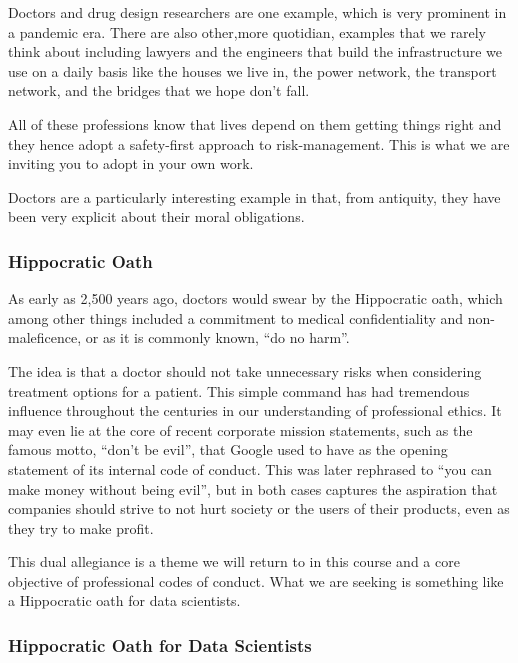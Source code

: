 \documentclass[
]{book}
\theoremstyle{definition}
\theoremstyle{definition}
\theoremstyle{definition}
\theoremstyle{definition}
\theoremstyle{remark}
\begin{document}
Doctors and drug design researchers are one example, which is very prominent in a pandemic era. There are also other,more quotidian, examples that we rarely think about including lawyers and the engineers that build the infrastructure we use on a daily basis like the houses we live in, the power network, the transport network, and the bridges that we hope don't fall.

All of these professions know that lives depend on them getting things right and they hence adopt a safety-first approach to risk-management. This is what we are inviting you to adopt in your own work.

Doctors are a particularly interesting example in that, from antiquity, they have been very explicit about their moral obligations.

\hypertarget{hippocratic-oath}{%
\subsubsection{Hippocratic Oath}\label{hippocratic-oath}}

As early as 2,500 years ago, doctors would swear by the Hippocratic oath, which among other things included a commitment to medical confidentiality and non-maleficence, or as it is commonly known, ``do no harm''.

The idea is that a doctor should not take unnecessary risks when considering treatment options for a patient. This simple command has had tremendous influence throughout the centuries in our understanding of professional ethics. It may even lie at the core of recent corporate mission statements, such as the famous motto, ``don't be evil'', that Google used to have as the opening statement of its internal code of conduct. This was later rephrased to ``you
can make money without being evil'', but in both cases captures the aspiration that companies should strive to not hurt society or the users of their products, even as they try to make profit.

This dual allegiance is a theme we will return to in this course and a core objective of professional codes of conduct. What we are seeking is something like a Hippocratic oath for data scientists.

\hypertarget{hippocratic-oath-for-data-scientists}{%
\subsubsection{Hippocratic Oath for Data Scientists}\label{hippocratic-oath-for-data-scientists}}
\end{document}

